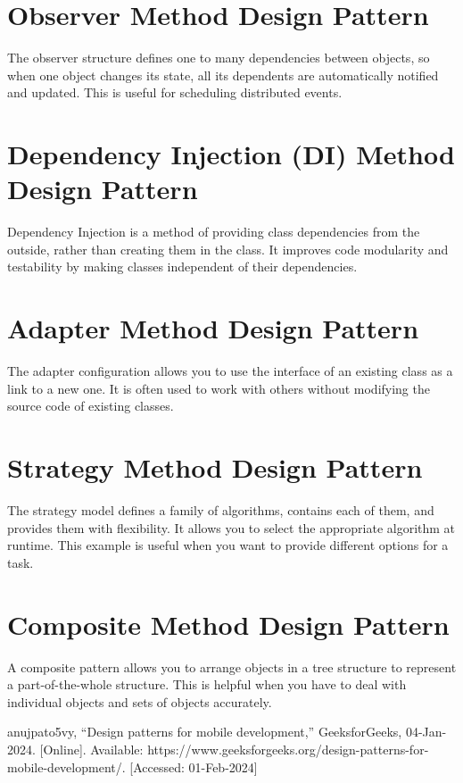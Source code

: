 \documentclass[conference]{IEEEtran}
\begin{document}
\section{Observer Method Design Pattern}
The observer structure defines one to many dependencies between objects, so when one object changes its state, all its dependents are automatically notified and updated. This is useful for scheduling distributed events.

\section{Dependency Injection (DI) Method Design Pattern}
Dependency Injection is a method of providing class dependencies from the outside, rather than creating them in the class. It improves code modularity and testability by making classes independent of their dependencies.

\section{Adapter Method Design Pattern}
The adapter configuration allows you to use the interface of an existing class as a link to a new one. It is often used to work with others without modifying the source code of existing classes.

\section{Strategy Method Design Pattern}
The strategy model defines a family of algorithms, contains each of them, and provides them with flexibility. It allows you to select the appropriate algorithm at runtime. This example is useful when you want to provide different options for a task.

\section{Composite Method Design Pattern}
A composite pattern allows you to arrange objects in a tree structure to represent a part-of-the-whole structure. This is helpful when you have to deal with individual objects and sets of objects accurately.




\begin{thebibliography}{00}
 anujpato5vy, “Design patterns for mobile development,” GeeksforGeeks, 04-Jan-2024.  [Online]. Available: https://www.geeksforgeeks.org/design-patterns-for-mobile-development/. [Accessed: 01-Feb-2024] 
\end{thebibliography}
\end{document}
